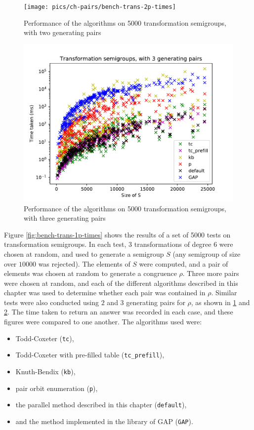 \begin{figure}[h]
  \centering
  \texttt{[image: pics/ch-pairs/bench-trans-2p-times]}
  \caption{Performance of the algorithms on 5000 transformation semigroups, with
    two generating pairs}
  \label{fig:bench-trans-2p-times}
\end{figure}

\begin{figure}[h]
  \centering
  \includegraphics[width=\textwidth]{pics/ch-pairs/bench-trans-3p-times}
  \caption{Performance of the algorithms on 5000 transformation semigroups, with
    three generating pairs}
  \label{fig:bench-trans-3p-times}
\end{figure}

Figure \ref{fig:bench-trans-1p-times} shows the results of a set of 5000 tests
on transformation semigroups.  In each test, $3$ transformations of degree $6$
were chosen at random, and used to generate a semigroup $S$ (any semigroup of
size over $10000$ was rejected).  The elements of $S$ were computed, and a pair
of elements was chosen at random to generate a congruence $\rho$.  Three more
pairs were chosen at random, and each of the different algorithms described in
this chapter was used to determine whether each pair was contained in $\rho$.
Similar tests were also conducted using $2$ and $3$ generating pairs for $\rho$,
as shown in \ref{fig:bench-trans-2p-times} and \ref{fig:bench-trans-3p-times}.
The time taken to return an answer was recorded in each case, and these figures
were compared to one another.  The algorithms used were:
\begin{itemize}
\item Todd-Coxeter (\texttt{tc}),
\item Todd-Coxeter with pre-filled table (\texttt{tc\_prefill}),
\item Knuth-Bendix (\texttt{kb}),
\item pair orbit enumeration (\texttt{p}),
\item the parallel method described in this chapter (\texttt{default}),
\item and the method implemented in the library of GAP (\texttt{GAP}).
\end{itemize}


